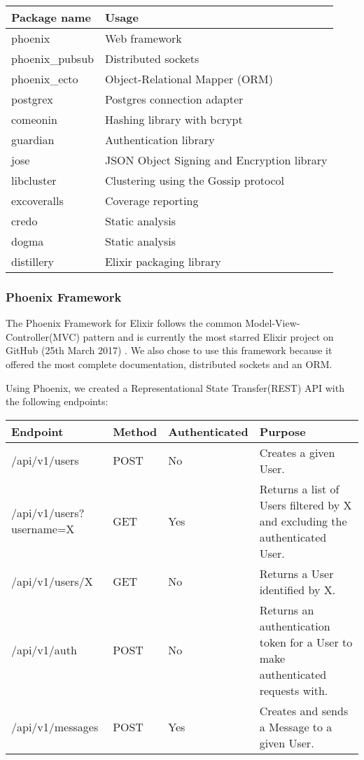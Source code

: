 \documentclass[11pt,a4paper]{report}
\begin{document}
\begin{tabular}{ | l | l |}
  \hline
  Package name & Usage \\
  \hline
  phoenix & Web framework \\
  phoenix\_pubsub & Distributed sockets \\
  phoenix\_ecto & Object-Relational Mapper (ORM) \\
  \hline
  postgrex & Postgres connection adapter \\
  comeonin & Hashing library with bcrypt \\
  guardian & Authentication library \\
  jose & JSON Object Signing and Encryption library \\
  libcluster & Clustering using the Gossip protocol \\
  \hline
  excoveralls & Coverage reporting \\
  credo & Static analysis \\
  dogma & Static analysis \\
  distillery & Elixir packaging library \\
  \hline
\end{tabular}

\subsubsection{Phoenix Framework}

The Phoenix Framework for Elixir follows the common Model-View-Controller(MVC) pattern and is currently the most starred Elixir project on GitHub (25th March 2017) \cite{website:github_elixir_trending}. We also chose to use this framework because it offered the most complete documentation, distributed sockets and an ORM.

Using Phoenix, we created a Representational State Transfer(REST) API with the following endpoints:

\begin{center}
\begin{tabular}{ | l | l | l | p{4cm} |}
  \hline
  Endpoint & Method & Authenticated & Purpose \\
  \hline
  /api/v1/users & POST & No & Creates a given User. \\
  \hline
  /api/v1/users?username=X & GET & Yes & Returns a list of Users filtered by X and excluding the authenticated User. \\
  \hline
  /api/v1/users/X & GET & No & Returns a User identified by X. \\
  \hline
  /api/v1/auth & POST & No & Returns an authentication token for a User to make authenticated requests with. \\
  \hline
  /api/v1/messages & POST & Yes & Creates and sends a Message to a given User. \\
  \hline
\end{tabular}
\end{center}
\end{document}
